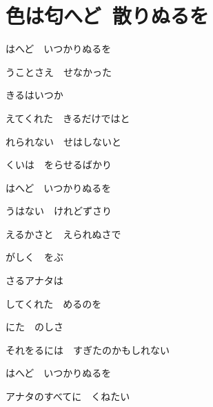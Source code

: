 \section{色は匂へど~散りぬるを}

はへど　いつかりぬるを

うことさえ　せなかった

\bigskip

きるはいつか

えてくれた　きるだけではと

れられない　せはしないと

くいは　をらせるばかり

\bigskip

はへど　いつかりぬるを

うはない　けれどずさり

えるかさと　えられぬさで

がしく　をぶ

\bigskip

さるアナタは

してくれた　めるのを

にた　のしさ

それをるには　すぎたのかもしれない

\bigskip

はへど　いつかりぬるを

アナタのすべてに　くねたい

